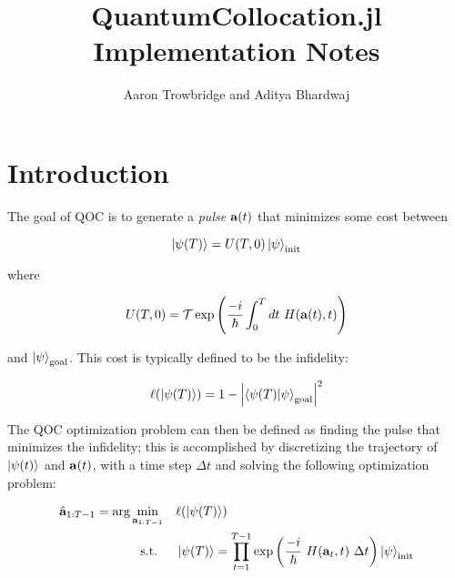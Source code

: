 \documentclass{article}
\title{QuantumCollocation.jl Implementation Notes}
\author{Aaron Trowbridge and Aditya Bhardwaj}
\date{}
\begin{document}
\maketitle



\tableofcontents

\newpage


\section{Introduction}

The goal of QOC is to generate a \textit{pulse} $\vb{a}(t)$ that minimizes some cost between 

\begin{equation} 
  \ket{\psi(T)} = U(T, 0) \ket{\psi}_{\text{init}}
\end{equation}

where

\begin{equation}
  U(T, 0) = \mathcal{T} \exp \qty( \frac{-i}{\hbar} \int_0^T dt \ H(\vb{a}(t), t)) 
\end{equation}

and $\ket{\psi}_{\text{goal}}$. This cost is typically defined to be the infidelity:

\begin{equation}
  \ell \qty(\ket{\psi(T)}) = 1 - \abs{\bra{\psi(T)} \ket{\psi}_{\text{goal}}}^2
\end{equation}

The QOC optimization problem can then be defined as finding the pulse that minimizes the infidelity; this is accomplished by discretizing the trajectory of $\ket{\psi(t)}$ and $\vb{a}(t)$, with a time step $\Delta t$ and solving the following optimization problem:

\begin{align*}
  \hat{\vb{a}}_{1:T-1} = \arg \min_{\vb{a}_{1:T-1}} \quad &\ell \qty(\ket{\psi(T)})\\
  \text{s.t. } \quad 
    & \ket{\psi(T)} = \prod_{t=1}^{T-1} \exp \qty( \frac{-i}{\hbar} \ H(\vb{a}_t, t) \ \Delta t) \ket{\psi}_{\text{init}} \\
\end{align*}
\end{document}
